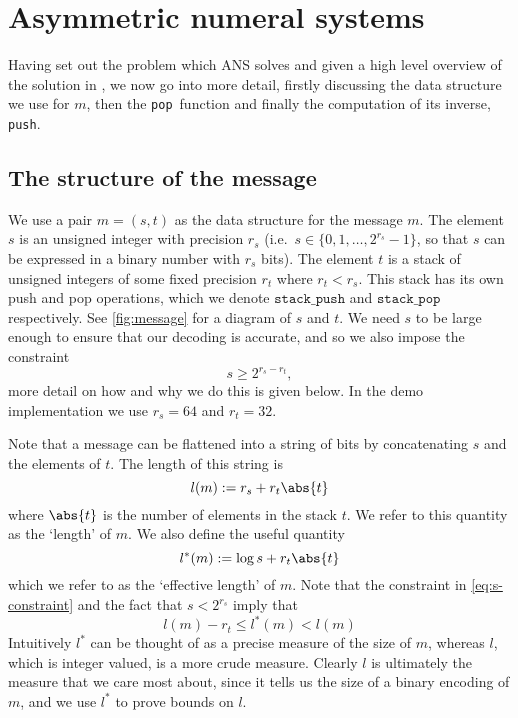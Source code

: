 \documentclass{article}
\theoremstyle{definition}
\newcommand{\push}{\texttt{push}}
\newcommand{\pop}{\texttt{pop}}
\begin{document}
\section{Asymmetric numeral systems}
  Having set out the problem which ANS solves and given a high level overview
  of the solution in , we now go into more detail, firstly
  discussing the data structure we use for \(m\), then the \pop\ function and
  finally the computation of its inverse, \push.


\subsection{The structure of the message}\label{sec:message}
  We use a pair \(m = (s, t)\) as the data structure for the message \(m\). The
  element \(s\) is an unsigned integer with precision \(r_s\) (i.e.\ \(s \in
  \{0, 1, \ldots, 2^{r_s} - 1\}\), so that \(s\) can be expressed in a binary
  number with \(r_s\) bits). The element \(t\) is a stack of unsigned
  integers of some fixed precision \(r_t\) where \(r_t < r_s\).  This stack has
  its own push and pop operations, which we denote \(\texttt{stack\_push}\) and
  \(\texttt{stack\_pop}\) respectively. See \cref{fig:message} for a diagram of
  \(s\) and \(t\).  We need \(s\) to be large enough to ensure that our
  decoding is accurate, and so we also impose the constraint
  \begin{equation}\label{eq:s-constraint}
    s\geq2^{r_s - r_t},
  \end{equation}
  more detail on how and why we do this is given below. In the demo
  implementation we use \(r_s = 64\) and \(r_t = 32\).

  Note that a message can be flattened into a string of bits by concatenating
  \(s\) and the elements of \(t\). The length of this string is
  \begin{equation}
    l(m) := r_s + r_t\abs{t}
  \end{equation}
  where \(\abs{t}\) is the number of elements in the stack \(t\). We refer to
  this quantity as the `length' of \(m\). We also define the useful quantity
  \begin{equation}
    l^*(m) := \log s + r_t\abs{t}
  \end{equation}
  which we refer to as the `effective length' of \(m\). Note that the
  constraint in \cref{eq:s-constraint} and the fact that \(s < 2^{r_s}\) imply
  that
  \begin{equation}\label{eq:effective-length}
    l(m) - r_t \leq l^*(m) < l(m)
  \end{equation}
  Intuitively \(l^*\) can be thought of as a precise measure of the size of
  \(m\), whereas \(l\), which is integer valued, is a more crude measure.
  Clearly \(l\) is ultimately the measure that we care most about, since it
  tells us the size of a binary encoding of \(m\), and we use \(l^*\) to prove
  bounds on \(l\).
\end{document}
